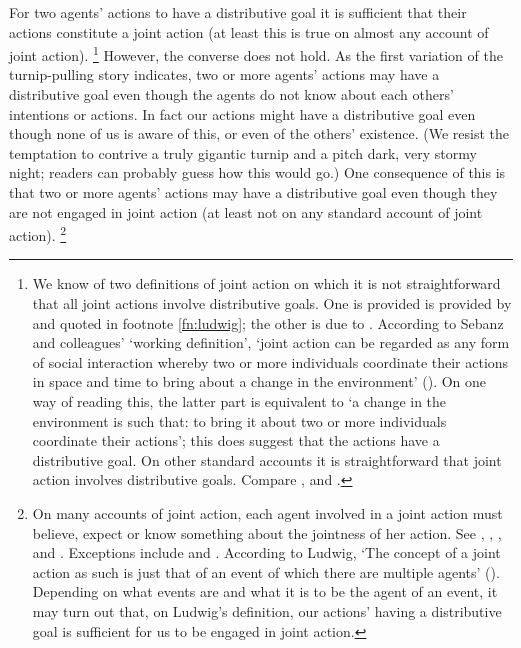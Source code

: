 \documentclass[12pt,\papersize]{extarticle}
\begin{document}
For two agents' actions to have a distributive goal it is sufficient that their actions constitute a joint action 
(at least this is true on almost any account of joint action).%
\footnote{
\label{fn:joint_action_distributive_goal}
We know of two definitions of joint action on which it is not straightforward that all joint actions involve distributive goals.
One is provided 
 is provided by \citet[p.\ 366]{ludwig_collective_2007} and quoted in footnote \vref{fn:ludwig}; the other is due to 
\citet[p.\ 70]{Sebanz:2006yq}.
According to Sebanz and colleagues' `working definition', 
`joint action can be regarded as any form of social interaction whereby two or more individuals coordinate their actions in space and time to bring about a change in the environment'
(\citeyear[p.\ 70]{Sebanz:2006yq}).
On one way of reading this, the latter part is equivalent to `a change in the environment is such that: to bring it about two or more individuals coordinate their actions';
 this does suggest that the actions have a distributive goal.
On other standard accounts it is straightforward that joint action involves distributive goals.
Compare 
	\citet[pp.\ 329-31]{Bratman:1992mi},
	\citet[pp.\ 96-7]{Searle:1990em} and
	\citet[pp.\ 168-9]{gilbert:2009shared}.
}
However, the converse does not hold.
As the first variation of the turnip-pulling story indicates,
two or more agents' actions may have a distributive goal 
even though the agents do not know about each others' intentions or actions.
In fact our actions might have a distributive goal even though none of us is aware of this, or even of the others' existence. 
(We resist the temptation to contrive a truly gigantic turnip and a pitch dark, very stormy night; readers can probably guess how this would go.)
One consequence of this is that 
two or more agents' actions may have a distributive goal
even though they are not engaged in joint action
(at least not on any standard account of joint action).%
\footnote{
On many accounts of joint action, each agent involved in a joint action must believe, expect or know something about the jointness of her action.
See 
	\citet[p.\ 103]{Bratman:1993je}, %
	\citet[p.\ 40]{Butterfill:2011fk},
	\citet[p.\ 10]{Kutz:2000si}, %
	\citet[p. 56]{miller_social_2001} %
	and
	\citet[p.\ 361]{Roth:2004ki}. %
Exceptions include  \citet{pacherie_framing_2011} and \citet{ludwig_collective_2007}.
\label{fn:ludwig}
According to Ludwig,
`The concept of a joint action as such is just that of an event of which there are multiple agents' (\citeyear[p.\ 366]{ludwig_collective_2007}).
Depending on what events are and what it is to be the agent of an event,
it may turn out that,
on Ludwig's definition,
our actions' having a distributive goal 
is sufficient for
us to be engaged in joint action.
}
\end{document}
